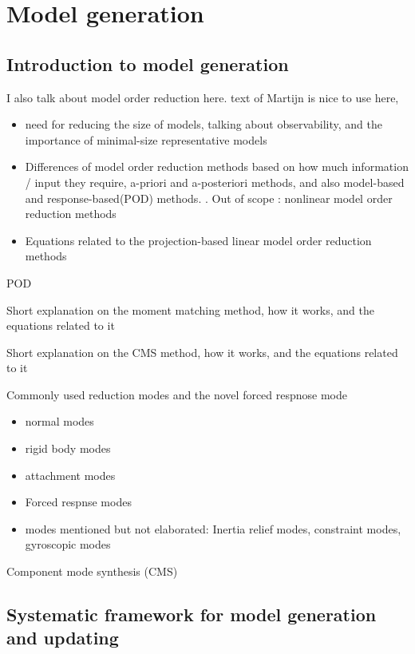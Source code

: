 \chapter{Model generation}\label{ch:Model_generation}

\section{Introduction to model generation}
I also talk about model order reduction here. text of Martijn is nice to use here,

\begin{itemize}
    \item need for reducing the size of models, talking about observability, and the importance of minimal-size representative models
    \item Differences of model order reduction methods based on how much information / input they require, a-priori and a-posteriori methods, and also model-based and response-based(POD) methods. \cite{besselink_comparison_2013}. Out of scope : nonlinear model order reduction methods
    \item Equations related to the projection-based linear model order reduction methods
\end{itemize}

POD

Short explanation on the moment matching method, how it works, and the equations related to it

Short explanation on the CMS method, how it works, and the equations related to it

Commonly used reduction modes and the novel forced respnose mode
\begin{itemize}
    \item normal modes
    \item rigid body modes
    \item attachment modes
    \item Forced respnse modes
    \item modes mentioned but not elaborated: Inertia relief modes, constraint modes, gyroscopic modes
\end{itemize}

Component mode synthesis (CMS)

\section{Systematic framework for model generation and updating}

